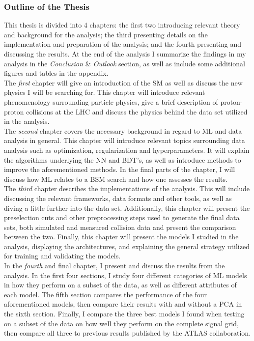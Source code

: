 \subsubsection*{Outline of the Thesis}
This thesis is divided into 4 chapters: the first two introducing relevant theory and background for the analysis; the third presenting 
details on the implementation and preparation of the analysis; and the fourth presenting and discussing the results. At the end of the analysis I summarize 
the findings in my analysis in the \emph{Conclusion $\&$ Outlook} section, as well as include some additional figures and tables 
in the appendix. 
\\\newline
The \emph{first} chapter will give an introduction of the \ac{SM} as well as discuss the new physics I will be searching for. This chapter will 
introduce relevant phenomenology surrounding particle physics, give a brief description of proton-proton collisions at the \ac{LHC} and discuss 
the physics behind the data set utilized in the analysis. 
\\\newline
The \emph{second} chapter covers the necessary background in regard to \ac{ML} and data analysis in general. This chapter will introduce relevant topics
surrounding data analysis such as optimization, regularization and hyperparameters. It will explain the algorithms underlying the \ac{NN} and 
\ac{BDT}'s, as well as introduce methods to improve the aforementioned methods. In the final parts of the chapter, I will discuss how \ac{ML} relates to 
a \acf{BSM} search and how one assesses the results.
\\\newline
The \emph{third} chapter describes the implementations of the analysis. This will include discussing the relevant frameworks, data formats and 
other tools, as well as diving a little further into the data set. Additionally, this chapter will present the preselection cuts and other preprocessing steps
used to generate the final data sets, both simulated and measured collision data and present the comparison between the two. Finally, this chapter will present the 
models I studied in the analysis, displaying the architectures, and explaining the general strategy utilized for training and validating the models.
\\\newline
In the \emph{fourth} and final chapter, I present and discuss the results from the analysis. In the first four sections, I study four different categories of \ac{ML} models in how they 
perform on a subset of the data, as well as different attributes of each model. The fifth section compares the performance of the four aforementioned models, then compare 
their results with and without a \acf{PCA} in the sixth section. Finally, I compare the three best models I found when testing on a subset of the data on how well they perform 
on the complete signal grid, then compare all three to previous results published by the \acs{ATLAS} collaboration.



